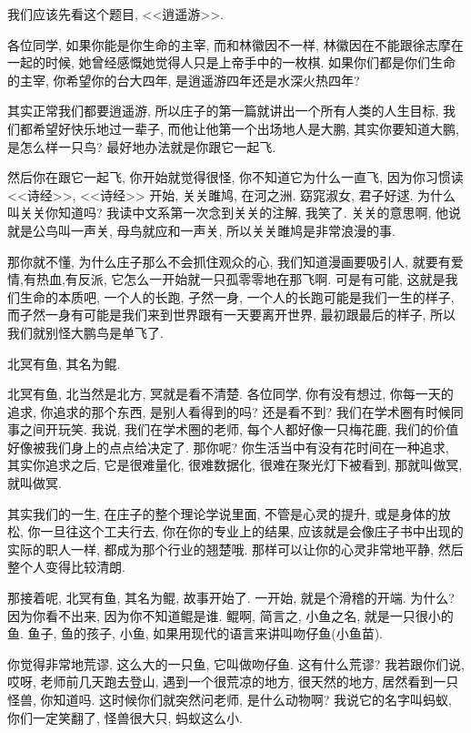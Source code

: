\documentclass[11pt]{article}
\begin{document}
我们应该先看这个题目, <<逍遥游>>. 

各位同学, 如果你能是你生命的主宰, 而和林徽因不一样, 林徽因在不能跟徐志摩在一起的时候, 她曾经感慨她觉得人只是上帝手中的一枚棋. 如果你们都是你们生命的主宰, 你希望你的台大四年, 是逍遥游四年还是水深火热四年? 

其实正常我们都要逍遥游, 所以庄子的第一篇就讲出一个所有人类的人生目标, 我们都希望好快乐地过一辈子, 而他让他第一个出场地人是大鹏, 其实你要知道大鹏, 是怎么样一只鸟? 最好地办法就是你跟它一起飞. 

然后你在跟它一起飞, 你开始就觉得很怪, 你不知道它为什么一直飞, 因为你习惯读 <<诗经>>, <<诗经>> 开始, 关关雎鸠, 在河之洲. 窈窕淑女, 君子好逑. 为什么叫关关你知道吗? 我读中文系第一次念到关关的注解, 我笑了. 关关的意思啊, 他说就是公鸟叫一声关, 母鸟就应和一声关, 所以关关雎鸠是非常浪漫的事. 

那你就不懂, 为什么庄子那么不会抓住观众的心, 我们知道漫画要吸引人, 就要有爱情,有热血,有反派, 它怎么一开始就一只孤零零地在那飞啊. 可是有可能, 这就是我们生命的本质吧, 一个人的长跑, 孑然一身, 一个人的长跑可能是我们一生的样子, 而孑然一身有可能是我们来到世界跟有一天要离开世界, 最初跟最后的样子, 所以我们就别怪大鹏鸟是单飞了.


\begin{center}
	{\color{magenta} 北冥有鱼, 其名为鲲.}
\end{center}

\vspace{-0.5cm}

{\color{blue} 北冥有鱼}, 北当然是北方, 冥就是看不清楚. 各位同学, 你有没有想过, 你每一天的追求, 你追求的那个东西, 是别人看得到的吗? 还是看不到? 我们在学术圈有时候同事之间开玩笑. 我说, 我们在学术圈的老师, 每个人都好像一只梅花鹿, 我们的价值好像被我们身上的点点给决定了. 那你呢? 你生活当中有没有花时间在一种追求, 其实你追求之后, 它是很难量化, 很难数据化, 很难在聚光灯下被看到, 那就叫做冥, 就叫做冥.

其实我们的一生, 在庄子的整个理论学说里面, 不管是心灵的提升, 或是身体的放松, 你一旦往这个工夫行去, 你在你的专业上的结果, 应该就是会像庄子书中出现的实际的职人一样, 都成为那个行业的翘楚哦. 那样可以让你的心灵非常地平静, 然后整个人变得比较清朗.

那接着呢, {\color{blue} 北冥有鱼, 其名为鲲}, 故事开始了. 一开始, 就是个滑稽的开端. 为什么? 因为你看不出来, 因为你不知道鲲是谁. 鲲啊, 简言之, 小鱼之名, 就是一只很小的鱼. 鱼子, 鱼的孩子, 小鱼, 如果用现代的语言来讲叫吻仔鱼(小鱼苗). 

你觉得非常地荒谬, 这么大的一只鱼, 它叫做吻仔鱼. 这有什么荒谬? 我若跟你们说, 哎呀, 老师前几天跑去登山, 遇到一个很荒凉的地方, 很天然的地方, 居然看到一只怪兽, 你知道吗. 这时候你们就突然问老师, 是什么动物啊? 我说它的名字叫蚂蚁, 你们一定笑翻了, 怪兽很大只, 蚂蚁这么小. 
\end{document}
